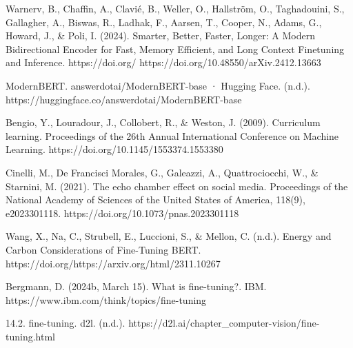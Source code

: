\documentclass[licencjacka,en]{pracamgr}
\begin{document}
\begin{thebibliography}{99}
Warnerv, B., Chaffin, A., Clavié, B., Weller, O., Hallström, O., Taghadouini, S., Gallagher, A., Biswas, R., Ladhak, F., Aarsen, T., Cooper, N., Adams, G., Howard, J., \& Poli, I. (2024). Smarter, Better, Faster, Longer: A Modern Bidirectional Encoder for Fast, Memory Efficient, and Long Context Finetuning and Inference. https://doi.org/ https://doi.org/10.48550/arXiv.2412.13663

ModernBERT. answerdotai/ModernBERT-base · Hugging Face. (n.d.). https://huggingface.co/answerdotai/ModernBERT-base

Bengio, Y., Louradour, J., Collobert, R., \& Weston, J. (2009). Curriculum learning. Proceedings of the 26th Annual International Conference on Machine Learning. https://doi.org/10.1145/1553374.1553380

Cinelli, M., De Francisci Morales, G., Galeazzi, A., Quattrociocchi, W., \& Starnini, M. (2021). The echo chamber effect on social media. Proceedings of the National Academy of Sciences of the United States of America, 118(9), e2023301118. https://doi.org/10.1073/pnas.2023301118

Wang, X., Na, C., Strubell, E., Luccioni, S., \& Mellon, C. (n.d.). Energy and Carbon Considerations of Fine-Tuning BERT. https://doi.org/https://arxiv.org/html/2311.10267

Bergmann, D. (2024b, March 15). What is fine-tuning?. IBM. https://www.ibm.com/think/topics/fine-tuning

14.2. fine-tuning. d2l. (n.d.). https://d2l.ai/chapter\_computer-vision/fine-tuning.html


\end{thebibliography}
\end{document}
